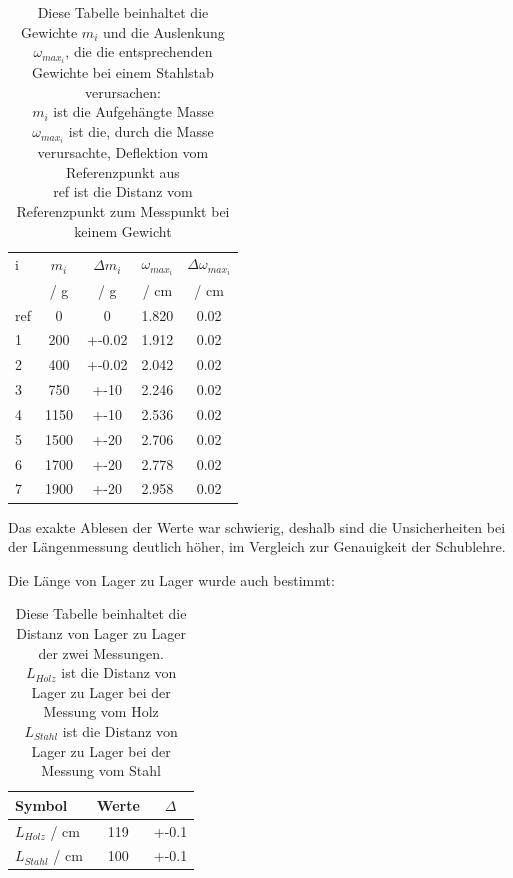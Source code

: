 \documentclass[11pt,ngerman]{scrartcl}
\begin{document}
\begin{table}[H]
	\centering
	\caption{
		Diese Tabelle beinhaltet die Gewichte $m_i$ und die Auslenkung $\omega_{max_{i}}$,
		die die entsprechenden Gewichte bei einem Stahlstab verursachen:\\
		$m_{i}$ ist die Aufgehängte Masse \\
		$\omega_{max_{i}}$ ist die, durch die Masse verursachte, Deflektion vom Referenzpunkt aus \\
		ref ist die Distanz vom Referenzpunkt zum Messpunkt bei keinem Gewicht \\
	}
	\label{tab:messwerte_stahl}
	\begin{tabular}{l|S|S|S|S}
		i   & {$m_i$}     & {$\Delta m_i$} & $\omega_{max_{i}}$ & $\Delta \omega_{max_{i}}$ \\
		{}  & {/ \si{\g}} & {/ \si{\g}}    & {/ \si{\cm}}       & {/ \si{\cm}}              \\ \hline \hline
		ref & 0           & 0              & 1.820              & 0.02                      \\
		1   & 200         & +-0.02         & 1.912              & 0.02                      \\
		2   & 400         & +-0.02         & 2.042              & 0.02                      \\
		3   & 750         & +-10           & 2.246              & 0.02                      \\
		4   & 1150        & +-10           & 2.536              & 0.02                      \\
		5   & 1500        & +-20           & 2.706              & 0.02                      \\
		6   & 1700        & +-20           & 2.778              & 0.02                      \\
		7   & 1900        & +-20           & 2.958              & 0.02                      \\
	\end{tabular}
\end{table}

Das exakte Ablesen der Werte war schwierig, deshalb sind die Unsicherheiten bei der Längenmessung
deutlich höher, im Vergleich zur Genauigkeit der Schublehre.


Die Länge von Lager zu Lager wurde auch bestimmt:

\begin{table}[H]
	\centering
	\caption{
		Diese Tabelle beinhaltet die Distanz von Lager zu Lager der
		zwei Messungen. \\
		$L_{Holz}$ ist die Distanz von Lager zu Lager bei der Messung vom Holz\\
		$L_{Stahl}$ ist die Distanz von Lager zu Lager bei der Messung vom Stahl\\
	}
	\label{tab:L}
	\begin{tabular}{l|S|S}
		Symbol                 & {Werte} & {$\Delta$} \\ \hline \hline
		$L_{Holz}$ / \si{\cm}  & 119     & +-0.1      \\
		$L_{Stahl}$ / \si{\cm} & 100     & +-0.1      \\
	\end{tabular}
\end{table}
\end{document}
